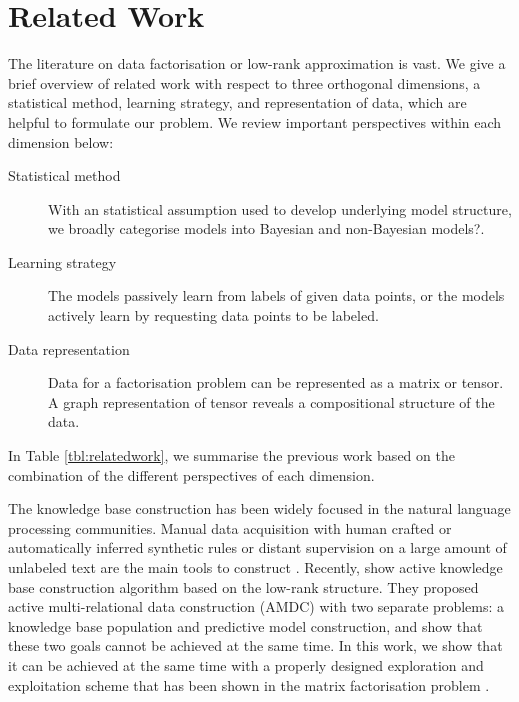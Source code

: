 
\section{Related Work}

The literature on data factorisation or low-rank approximation is vast. 
We give a brief overview of related work with respect to three
orthogonal dimensions, a statistical method, learning strategy, and 
representation of data, which are helpful to formulate our problem.
We review important perspectives within each dimension below:
\begin{description}
\item[Statistical method] With an statistical assumption used to develop 
underlying model structure, we broadly categorise models into Bayesian 
and non-Bayesian models?.
\item[Learning strategy] The models passively learn from labels of given 
data points, or the models actively learn by  requesting data points 
to be labeled.
\item[Data representation] Data for a factorisation problem can be 
represented as a matrix or tensor. A graph representation of tensor reveals
a compositional structure of the data.
\end{description}
In Table \ref{tbl:relatedwork}, we summarise the previous work based on 
the combination of the different perspectives of each dimension.

The knowledge base construction has been widely focused in the natural 
language processing communities. Manual data acquisition with human crafted 
or automatically inferred synthetic rules or distant supervision on a large
amount of unlabeled text are the main tools to construct \cite{fader2011identifying,Mintz2009}.
Recently, \citet{kajino2015active} show active knowledge base construction
algorithm based on the low-rank structure. They proposed active 
multi-relational data construction (AMDC) with two separate problems: 
a knowledge base population and predictive model construction, and show 
that these two goals cannot be achieved at the same time. In this work, 
we show that it can be achieved at the same time with a properly designed
exploration and exploitation scheme that has been shown in the matrix 
factorisation problem \cite{kawale2015efficient}.


